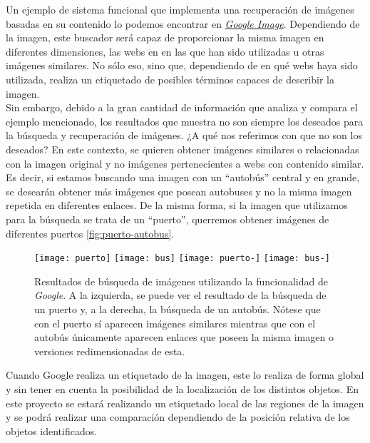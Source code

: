 Un ejemplo de sistema funcional que implementa una recuperación de imágenes basadas en su contenido lo podemos encontrar en \href{https://www.google.es/imghp?hl=es&authuser=0&ogbl}{\emph{Google Image}}. Dependiendo de la imagen, este buscador será capaz de proporcionar la misma imagen en diferentes dimensiones, las webs en en las que han sido utilizadas u otras imágenes similares. No sólo eso, sino que, dependiendo de en qué webs haya sido utilizada, realiza un etiquetado de posibles términos capaces de describir la imagen.\\

Sin embargo, debido a la gran cantidad de información que analiza y compara el ejemplo mencionado, los resultados que muestra no son siempre los deseados para la búsqueda y recuperación de imágenes. ¿A qué nos referimos con que no son los deseados? En este contexto, se quieren obtener imágenes similares o relacionadas con la imagen original y no imágenes pertenecientes a webs con contenido similar.\\

Es decir, si estamos buscando una imagen con un ``autobús'' central y en grande, se desearán obtener más imágenes que posean autobuses y no la misma imagen repetida en diferentes enlaces. De la misma forma, si la imagen que utilizamos para la búsqueda se trata de un ``puerto'', querremos obtener imágenes de diferentes puertos \autoref{fig:puerto-autobus}.\\

\begin{figure}[h!]
  \centering
  \texttt{[image: puerto]}
  \texttt{[image: bus]}
  \texttt{[image: puerto-]}
  \texttt{[image: bus-]}
  \caption{Resultados de búsqueda de imágenes utilizando la funcionalidad de \emph{Google}. A la izquierda, se puede ver el resultado de la búsqueda de un puerto y, a la derecha, la búsqueda de un autobús. Nótese que con el puerto sí aparecen imágenes similares mientras que con el autobús únicamente aparecen enlaces que poseen la misma imagen o versiones redimensionadas de esta.}
  \label{fig:puerto-autobus}
\end{figure}

\newpage
Cuando Google realiza un etiquetado de la imagen, este lo realiza de forma global y sin tener en cuenta la posibilidad de la localización de los distintos objetos. En este proyecto se estará realizando un etiquetado local de las regiones de la imagen y se podrá realizar una comparación dependiendo de la posición relativa de los objetos identificados.\\

